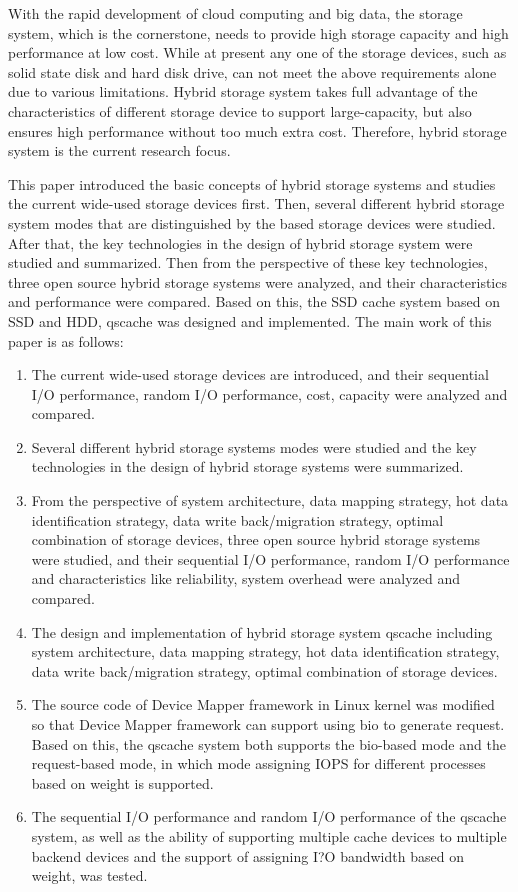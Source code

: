 \begin{englishabstract}

With the rapid development of cloud computing and big data, the storage system, which is the cornerstone, needs to provide high storage capacity and high performance at low cost. While at present any one of the storage devices, such as solid state disk and hard disk drive, can not meet the above requirements alone due to various limitations. Hybrid storage system takes full advantage of the characteristics of different storage device to support large-capacity, but also ensures high performance without too much extra cost. Therefore, hybrid storage system is the current research focus. 

This paper introduced the basic concepts of hybrid storage systems and studies the current wide-used storage devices first. Then, several different hybrid storage system modes that are distinguished by the based storage devices were studied. After that, the key technologies in the design of hybrid storage system were studied and summarized. Then from the perspective of these key technologies, three open source hybrid storage systems were analyzed, and their characteristics and performance were compared. Based on this, the SSD cache system based on SSD and HDD, qscache was designed and implemented. The main work of this paper is as follows:


\begin{enumerate}[wide]
    \item The current wide-used storage devices are introduced, and their sequential I/O performance, random I/O performance, cost, capacity were analyzed and compared.
    \item Several different hybrid storage systems modes were studied and the key technologies in the design of hybrid storage systems were summarized.
    \item From the perspective of system architecture, data mapping strategy, hot data identification strategy, data write back/migration strategy, optimal combination of storage devices, three open source hybrid storage systems were studied, and their sequential I/O performance, random I/O performance and characteristics like reliability, system overhead were analyzed and compared.
    \item The design and implementation of hybrid storage system qscache including system architecture, data mapping strategy, hot data identification strategy, data write back/migration strategy, optimal combination of storage devices.
    \item The source code of Device Mapper framework in Linux kernel was modified so that Device Mapper framework can support using bio to generate request. Based on this, the qscache system both supports the bio-based mode and the request-based mode, in which mode assigning IOPS for different processes based on weight is supported.
    \item The sequential I/O performance and random I/O performance of the qscache system, as well as the ability of supporting multiple cache devices to multiple backend devices and the support of assigning I?O bandwidth based on weight, was tested.
\end{enumerate}


\end{englishabstract}
